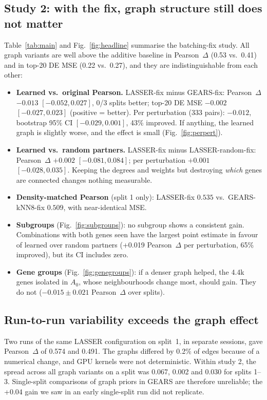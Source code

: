 \documentclass[11pt]{article}
\newcommand{\GEARS}{\textsc{GEARS}}
\newcommand{\LASSER}{\textsc{LASSER}}
\begin{document}
\subsection{Study 2: with the fix, graph structure still does not matter}
Table~\ref{tab:main} and Fig.~\ref{fig:headline} summarise the batching-fix study. All graph variants are well above
the additive baseline in Pearson~$\Delta$ (0.53 vs.\ 0.41) and in top-20 DE MSE (0.22 vs.\ 0.27), and they are
indistinguishable from each other:
\begin{itemize}
  \item \textbf{Learned vs.\ original Pearson.} \LASSER-fix minus \GEARS-fix: Pearson~$\Delta$ $-0.013$
        $[-0.052, 0.027]$, 0/3 splits better; top-20 DE MSE $-0.002$ $[-0.027, 0.023]$ (positive = better).
        Per perturbation (333 pairs): $-0.012$, bootstrap 95\% CI $[-0.029, 0.001]$, 43\% improved. If anything,
        the learned graph is slightly worse, and the effect is small (Fig.~\ref{fig:perpert}).
  \item \textbf{Learned vs.\ random partners.} \LASSER-fix minus \LASSER-random-fix: Pearson~$\Delta$ $+0.002$
        $[-0.081, 0.084]$; per perturbation $+0.001$ $[-0.028, 0.035]$. Keeping the degrees and weights but
        destroying \emph{which} genes are connected changes nothing measurable.
  \item \textbf{Density-matched Pearson} (split 1 only): \LASSER-fix $0.535$ vs.\ \GEARS-kNN8-fix $0.509$, with
        near-identical MSE.
  \item \textbf{Subgroups} (Fig.~\ref{fig:subgroups}): no subgroup shows a consistent gain. Combinations with both
        genes seen have the largest point estimate in favour of learned over random partners (+0.019 Pearson~$\Delta$
        per perturbation, 65\% improved), but its CI includes zero.
  \item \textbf{Gene groups} (Fig.~\ref{fig:genegroups}): if a denser graph helped, the 4.4k genes isolated in
        $A_0$, whose neighbourhoods change most, should gain. They do not ($-0.015 \pm 0.021$ Pearson~$\Delta$ over
        splits).
\end{itemize}

\subsection{Run-to-run variability exceeds the graph effect}
Two runs of the same \LASSER{} configuration on split~1, in separate sessions, gave Pearson~$\Delta$ of 0.574 and
0.491. The graphs differed by 0.2\% of edges because of a numerical change, and GPU kernels were not
deterministic. Within study 2, the spread across all graph variants on a split was 0.067, 0.002 and 0.030 for
splits 1--3. Single-split comparisons of graph priors in \GEARS{} are therefore unreliable; the +0.04 gain we saw
in an early single-split run did not replicate.
\end{document}
